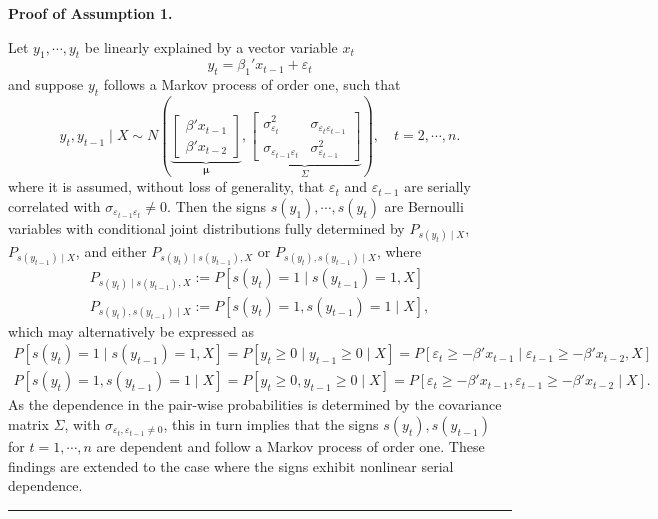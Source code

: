 \documentclass[harvard,11pt]{article}
\newenvironment{proof}[1][Proof]{\textbf{#1.} }{\  \rule{0.5em}{0.5em}}
\begin{document}
\begin{proof}[Proof of Assumption 1]

Let $y_1,\cdots,y_t$ be linearly explained by a vector variable $x_t$
\begin{equation*}
y_{t}=\beta_1'x_{t-1}+\varepsilon_{t}
\end{equation*}%
and suppose $y_t$ follows a Markov process of order one, such that
\[
y_t,y_{t-1}\mid X\sim N\left( 
\underbrace{\begin{bmatrix}
\beta'x_{t-1}\\
\beta'x_{t-2}
\end{bmatrix}}_{\bm{\mu}},
\underbrace{
\begin{bmatrix}
\sigma^2_{\varepsilon_t}&\sigma_{\varepsilon_t\varepsilon_{t-1}}\\
\sigma_{\varepsilon_{t-1}\varepsilon_t} &\sigma^2_{\varepsilon_{t-1}}
\end{bmatrix}}_{\Sigma}
\right),\quad t=2,\cdots,n.
\]
where it is assumed, without loss of generality, that $\varepsilon_t$ and $\varepsilon_{t-1}$ are serially correlated with $\sigma_{\varepsilon_{t-1}\varepsilon_t}\neq0$. Then the signs $s(y_1),\cdots,s(y_t)$ are Bernoulli variables with conditional joint distributions fully determined by $P_{s(y_t)\mid X}$, $P_{s(y_{t-1})\mid X}$, and either $P_{s(y_t)\mid s(y_{t-1}),X}$ or $P_{s(y_t),s(y_{t-1})\mid X}$, where
\begin{eqnarray*}
P_{s(y_t)\mid s(y_{t-1}),X}:=P[s(y_t)=1\mid s(y_{t-1})=1,X]\\
P_{s(y_t),s(y_{t-1})\mid X}:=P[s(y_t)=1, s(y_{t-1})=1\mid X],
\end{eqnarray*}
which may alternatively be expressed as
\begin{eqnarray*}
P[s(y_t)=1\mid s(y_{t-1})=1,X]=P[y_t\geq0\mid y_{t-1}\geq0\mid X]=P[\varepsilon_t\geq -\beta'x_{t-1}\mid \varepsilon_{t-1}\geq -\beta'x_{t-2}, X]\\
P[s(y_t)=1,s(y_{t-1})=1\mid X]=P[y_t\geq0, y_{t-1}\geq0\mid X]=P[\varepsilon_t\geq -\beta'x_{t-1}, \varepsilon_{t-1}\geq -\beta'x_{t-2}\mid X].
\end{eqnarray*}
As the dependence in the pair-wise probabilities is determined by the covariance matrix $\Sigma$, with $\sigma_{\varepsilon_t,\varepsilon_{t-1}\neq0}$, this in turn implies that the signs $s(y_t),s(y_{t-1})$ for $t=1,\cdots,n$ are dependent and follow a Markov process of order one. These findings are extended to the case where the signs exhibit nonlinear serial dependence.
\end{proof}
\end{document}
